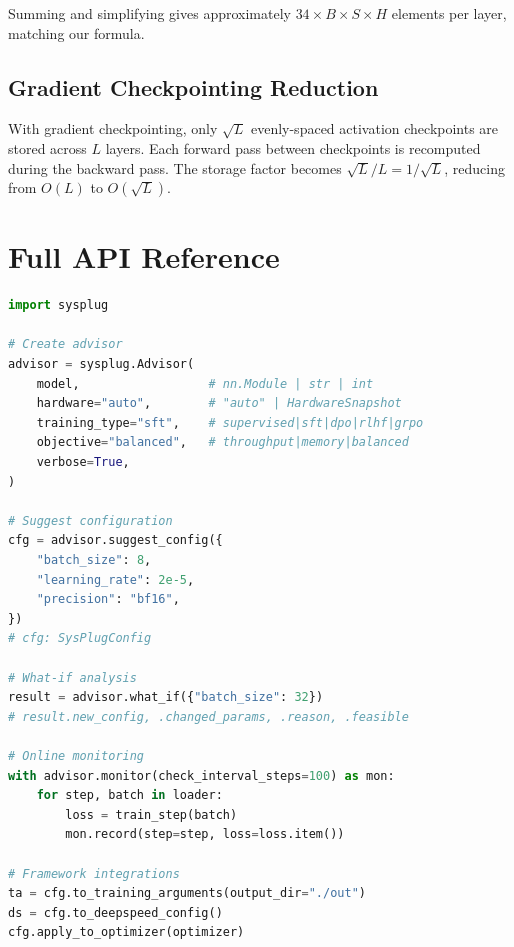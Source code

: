 \documentclass[10pt,twocolumn]{article}
\begin{document}
Summing and simplifying gives approximately $34 \times B \times S \times H$
elements per layer, matching our formula.

\subsection{Gradient Checkpointing Reduction}

With gradient checkpointing, only $\sqrt{L}$ evenly-spaced activation
checkpoints are stored across $L$ layers.  Each forward pass between
checkpoints is recomputed during the backward pass.  The storage factor
becomes $\sqrt{L}/L = 1/\sqrt{L}$, reducing from $O(L)$ to $O(\sqrt{L})$.

\section{Full API Reference}
\label{app:api}

\begin{lstlisting}[language=Python, caption={Core SysPlug API}]
import sysplug

# Create advisor
advisor = sysplug.Advisor(
    model,                  # nn.Module | str | int
    hardware="auto",        # "auto" | HardwareSnapshot
    training_type="sft",    # supervised|sft|dpo|rlhf|grpo
    objective="balanced",   # throughput|memory|balanced
    verbose=True,
)

# Suggest configuration
cfg = advisor.suggest_config({
    "batch_size": 8,
    "learning_rate": 2e-5,
    "precision": "bf16",
})
# cfg: SysPlugConfig

# What-if analysis
result = advisor.what_if({"batch_size": 32})
# result.new_config, .changed_params, .reason, .feasible

# Online monitoring
with advisor.monitor(check_interval_steps=100) as mon:
    for step, batch in loader:
        loss = train_step(batch)
        mon.record(step=step, loss=loss.item())

# Framework integrations
ta = cfg.to_training_arguments(output_dir="./out")
ds = cfg.to_deepspeed_config()
cfg.apply_to_optimizer(optimizer)
\end{lstlisting}
\end{document}
